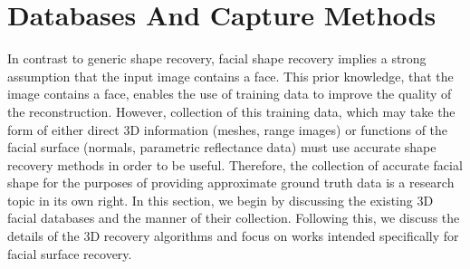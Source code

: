 \section{Databases And Capture Methods}\label{ch:bg_db_capture}
In contrast to generic shape recovery, facial shape recovery implies a strong
assumption that the input image contains a face. This prior knowledge, that the
image contains a face, enables the use of training data to improve the
quality of the reconstruction. However, collection of this training data, which
may take the form of either direct 3D information (meshes, range images) or
functions of the facial surface (normals, parametric reflectance data) must
use accurate shape recovery methods in order to be useful. Therefore, the
collection of accurate facial shape for the purposes of providing approximate
ground truth data is a research topic in its own right. In this section, we
begin by discussing the existing 3D facial databases and the manner of their
collection. Following this, we discuss the details of the 3D recovery algorithms
and focus on works intended specifically for facial surface recovery.
